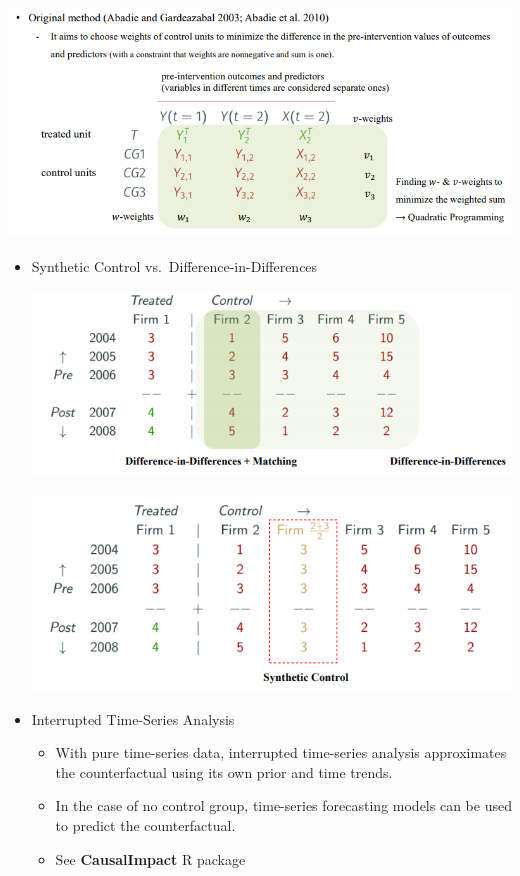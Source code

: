 \documentclass[
]{book}
\providecommand{\tightlist}{%
  \setlength{\itemsep}{0pt}\setlength{\parskip}{0pt}}
\theoremstyle{definition}
\theoremstyle{definition}
\theoremstyle{definition}
\theoremstyle{definition}
\theoremstyle{remark}
\begin{document}
\includegraphics{figures/32.png}

\begin{itemize}
\item
  Synthetic Control vs.~Difference-in-Differences

  \includegraphics{figures/28.png}

  \includegraphics{figures/29.png}
\item
  Interrupted Time-Series Analysis

  \begin{itemize}
  \tightlist
  \item
    With pure time-series data, interrupted time-series analysis approximates the counterfactual using its own prior and time trends.
  \item
    In the case of no control group, time-series forecasting models can be used to predict the counterfactual.
  \item
    See \textbf{CausalImpact} R package
  \end{itemize}
\end{itemize}
\end{document}
